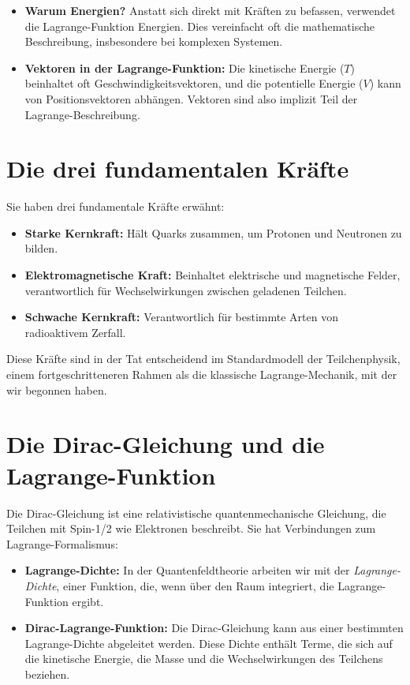 \documentclass{article}
\begin{document}
	\begin{itemize}
		\item \textbf{Warum Energien?} Anstatt sich direkt mit Kräften zu befassen, verwendet die Lagrange-Funktion Energien. Dies vereinfacht oft die mathematische Beschreibung, insbesondere bei komplexen Systemen.
		\item \textbf{Vektoren in der Lagrange-Funktion:} Die kinetische Energie ($T$) beinhaltet oft Geschwindigkeitsvektoren, und die potentielle Energie ($V$) kann von Positionsvektoren abhängen. Vektoren sind also implizit Teil der Lagrange-Beschreibung.
	\end{itemize}
	
	\section{Die drei fundamentalen Kräfte}
	
	Sie haben drei fundamentale Kräfte erwähnt:
	
	\begin{itemize}
		\item \textbf{Starke Kernkraft:} Hält Quarks zusammen, um Protonen und Neutronen zu bilden.
		\item \textbf{Elektromagnetische Kraft:} Beinhaltet elektrische und magnetische Felder, verantwortlich für Wechselwirkungen zwischen geladenen Teilchen.
		\item \textbf{Schwache Kernkraft:} Verantwortlich für bestimmte Arten von radioaktivem Zerfall.
	\end{itemize}
	
	Diese Kräfte sind in der Tat entscheidend im Standardmodell der Teilchenphysik, einem fortgeschritteneren Rahmen als die klassische Lagrange-Mechanik, mit der wir begonnen haben.
	
	\section{Die Dirac-Gleichung und die Lagrange-Funktion}
	
	Die Dirac-Gleichung ist eine relativistische quantenmechanische Gleichung, die Teilchen mit Spin-1/2 wie Elektronen beschreibt. Sie hat Verbindungen zum Lagrange-Formalismus:
	
	\begin{itemize}
		\item \textbf{Lagrange-Dichte:} In der Quantenfeldtheorie arbeiten wir mit der \textit{Lagrange-Dichte}, einer Funktion, die, wenn über den Raum integriert, die Lagrange-Funktion ergibt.
		\item \textbf{Dirac-Lagrange-Funktion:} Die Dirac-Gleichung kann aus einer bestimmten Lagrange-Dichte abgeleitet werden. Diese Dichte enthält Terme, die sich auf die kinetische Energie, die Masse und die Wechselwirkungen des Teilchens beziehen.
	\end{itemize}
	
\end{document}
